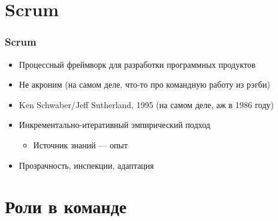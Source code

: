 \documentclass{../../slides-style}
\begin{document}
    \begin{frame}[plain]
        \titlepage
    \end{frame}

    \section{Scrum}

    \begin{frame}
        \frametitle{Scrum}
        \begin{itemize}
            \item Процессный фреймворк для разработки программных продуктов
            \item Не акроним (на самом деле, что-то про командную работу из рэгби)
            \item Ken Schwaber/Jeff Sutherland, 1995 (на самом деле, аж в 1986 году)
            \item Инкрементально-итеративный эмпирический подход
            \begin{itemize}
                \item Источник знаний --- опыт
            \end{itemize}
            \item Прозрачность, инспекции, адаптация
        \end{itemize}
    \end{frame}

    \section{Роли в команде}
\end{document}
